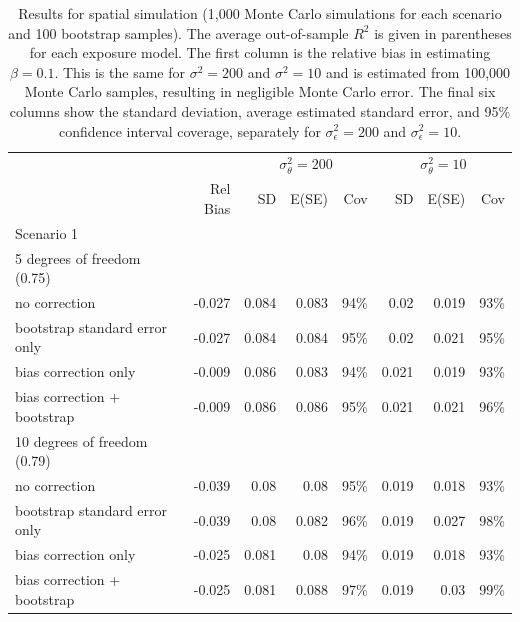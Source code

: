 \documentclass[12pt]{article}
\begin{document}
\clearpage
\newpage
\begin{table}
\caption{Results for spatial simulation (1,000 Monte Carlo simulations for each scenario and 100 bootstrap samples).  
The average
out-of-sample $R^2$ is given in parentheses for each exposure model.  The first column is the relative bias in estimating $\beta=0.1$.  
This is the same for $\sigma^2=200$ and $\sigma^2=10$ and is estimated from 100,000 Monte Carlo
samples, resulting in negligible Monte Carlo error.
The final six columns show the standard deviation, average estimated standard error, and 95$\%$ confidence interval coverage, separately for 
$\sigma_\epsilon^2=200$ and $\sigma_\epsilon^2=10$.}
\small
\centering

\begin{tabular}{lrrrrrrr}
\noalign {\vspace{0.05cm}}
&&\multicolumn{3}{c}{$\sigma^2_\theta=200$}&\multicolumn{3}{c}{$\sigma^2_\theta=10$}\\
&\textrm{Rel Bias}&\textrm{SD}&\textrm{E(SE)}&\textrm{Cov}&\textrm{SD}&\textrm{E(SE)}&\textrm{Cov}\\
\hline
\noalign {\vspace{0.05cm}}
\textrm{Scenario }1\\
\hline
\noalign {\vspace{0.05cm}}
\textrm{5 degrees of freedom }(0.75)\\
\noalign {\vspace{0.05cm}}
\quad \textrm{no correction}&-0.027&0.084&0.083&94\%&0.02&0.019&93\%\\
\quad \textrm{bootstrap standard error only}&-0.027&0.084&0.084&95\%&0.02&0.021&95\%\\
\quad \textrm{bias correction only}&-0.009&0.086&0.083&94\%&0.021&0.019&93\%\\
\quad \textrm{bias correction + bootstrap}&-0.009&0.086&0.086&95\%&0.021&0.021&96\%\\
\noalign {\vspace{0.05cm}}
\textrm{10 degrees of freedom }(0.79)\\
\noalign {\vspace{0.05cm}}
\quad \textrm{no correction}&-0.039&0.08&0.08&95\%&0.019&0.018&93\%\\
\quad \textrm{bootstrap standard error only}&-0.039&0.08&0.082&96\%&0.019&0.027&98\%\\
\quad \textrm{bias correction only}&-0.025&0.081&0.08&94\%&0.019&0.018&93\%\\
\quad \textrm{bias correction + bootstrap}&-0.025&0.081&0.088&97\%&0.019&0.03&99\%\\

\end{tabular}
\end{table}
\end{document}
